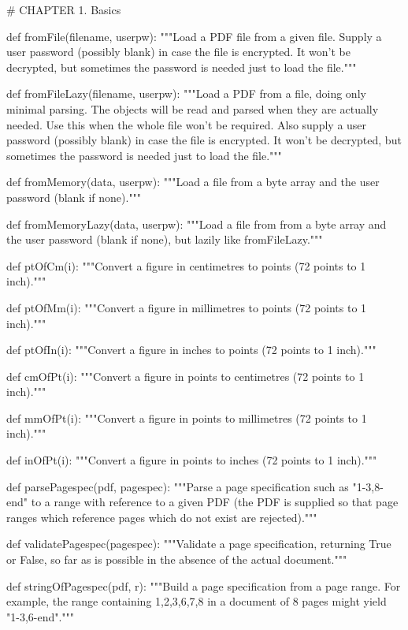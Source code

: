 # CHAPTER 1. Basics

def fromFile(filename, userpw):
    """Load a PDF file from a given file.  Supply a user password (possibly
    blank) in case the file is encrypted. It won't be decrypted, but sometimes
    the password is needed just to load the file."""

def fromFileLazy(filename, userpw):
    """Load a PDF from a file, doing only minimal parsing. The objects will be
    read and parsed when they are actually needed.  Use this when the whole
    file won't be required. Also supply a user password (possibly blank) in
    case the file is encrypted. It won't be decrypted, but sometimes the
    password is needed just to load the file."""

def fromMemory(data, userpw):
    """Load a file from a byte array and the user password (blank if none)."""

def fromMemoryLazy(data, userpw):
    """Load a file from from a byte array and the user password (blank if
    none), but lazily like fromFileLazy."""

def ptOfCm(i):
    """Convert a figure in centimetres to points (72 points to 1 inch)."""

def ptOfMm(i):
    """Convert a figure in millimetres to points (72 points to 1 inch)."""

def ptOfIn(i):
    """Convert a figure in inches to points (72 points to 1 inch)."""

def cmOfPt(i):
    """Convert a figure in points to centimetres (72 points to 1 inch)."""

def mmOfPt(i):
    """Convert a figure in points to millimetres (72 points to 1 inch)."""

def inOfPt(i):
    """Convert a figure in points to inches (72 points to 1 inch)."""

def parsePagespec(pdf, pagespec):
    """Parse a page specification such as "1-3,8-end" to a range with reference
    to a given PDF (the PDF is supplied so that page ranges which reference
    pages which do not exist are rejected)."""

def validatePagespec(pagespec):
    """Validate a page specification, returning True or False, so far as is
    possible in the absence of the actual document."""

def stringOfPagespec(pdf, r):
    """Build a page specification from a page range. For example, the range
    containing 1,2,3,6,7,8 in a document of 8 pages might yield "1-3,6-end"."""

